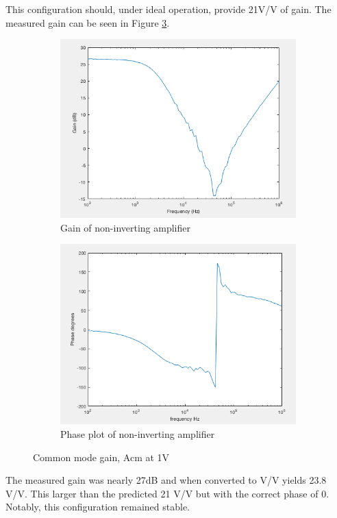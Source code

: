 This configuration should, under ideal operation, provide 21V/V  of gain. The measured gain can be seen in Figure \ref{fig:gainnoninverting}.
		
		
		
						\begin{figure}[H]
			\centering
			\begin{subfigure}[b]{0.45\textwidth}
				\centering
				\includegraphics[scale=.40]{ExperimentalImplementation/gainnoninverting.png}
\caption{Gain of non-inverting amplifier}
\label{fig:gainnoninverting1}
			\end{subfigure}
			\hfill
			\begin{subfigure}[b]{0.45\textwidth}
				\centering
			\includegraphics[scale=.40]{ExperimentalImplementation/phasenoninverting.png}
\caption{Phase plot of non-inverting amplifier}
\label{fig:phasenoninverting}
			\end{subfigure}
			\caption{Common mode gain, Acm at 1V}
			\label{fig:gainnoninverting}
		\end{figure} 
		
The measured gain was nearly 27dB and when converted to V/V yields 23.8 V/V.  This larger than the predicted 21 V/V but with the correct phase of 0. Notably, this configuration remained stable.



	
	